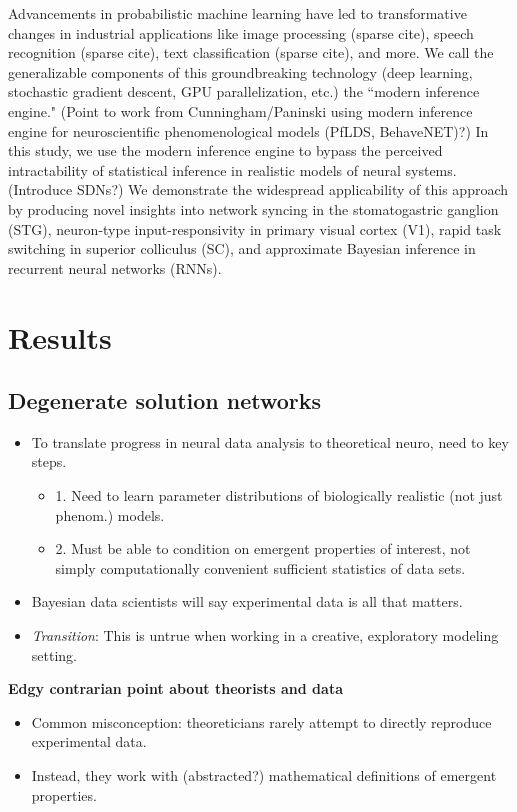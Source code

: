 \documentclass[11pt]{article}
\begin{document}
Advancements in probabilistic machine learning have led to transformative changes in industrial applications like image processing (sparse cite), speech recognition (sparse cite), text classification (sparse cite), and more.  We call the generalizable components of this groundbreaking technology (deep learning, stochastic gradient descent, GPU parallelization, etc.) the ``modern inference engine." (Point to work from Cunningham/Paninski using modern inference engine for neuroscientific phenomenological models (PfLDS, BehaveNET)?) In this study, we use the modern inference engine to bypass the perceived intractability of statistical inference in realistic models of neural systems.  (Introduce SDNs?)  We demonstrate the widespread applicability of this approach by producing novel insights into network syncing in the stomatogastric ganglion (STG), neuron-type input-responsivity in primary visual cortex (V1), rapid task switching in superior colliculus (SC), and approximate Bayesian inference in recurrent neural networks (RNNs). \\

\section{Results}
\subsection{Degenerate solution networks}
\begin{itemize}
\item To translate progress in neural data analysis to theoretical neuro, need to key steps.
\begin{itemize}
\item 1. Need to learn parameter distributions of biologically realistic (not just phenom.) models.
\item 2. Must be able to condition on emergent properties of interest, not simply computationally convenient sufficient statistics of data sets.
\end{itemize}
\item Bayesian data scientists will say experimental data is all that matters.  
\item \textit{Transition}: This is untrue when working in a creative, exploratory modeling setting.
\end{itemize}

\textbf{Edgy contrarian point about theorists and data}
\begin{itemize}
\item Common misconception: theoreticians rarely attempt to directly reproduce experimental data. 
\item Instead, they work with (abstracted?) mathematical definitions of emergent properties.  
\end{itemize}
\end{document}
